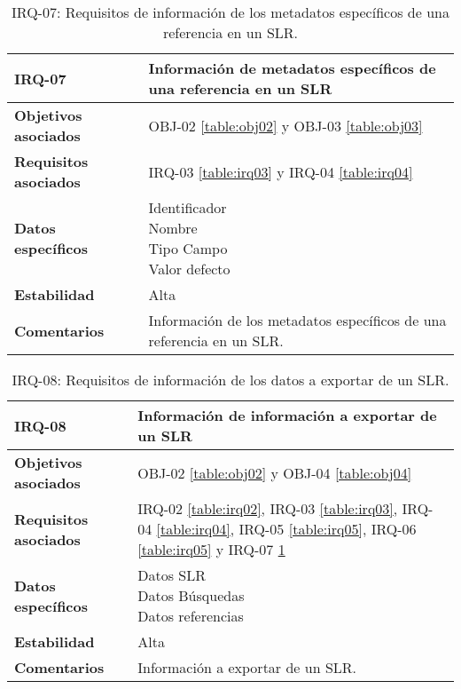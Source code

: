 \begin{table}[!hbt]
	\begin{center}
		\begin{tabular}{|p{5cm}|p{10cm}|}
			\hline
			\textbf{IRQ-07} & Información de metadatos específicos de una referencia en un SLR\\
			\hline
			\textbf{Objetivos asociados} & OBJ-02 \ref{table:obj02} y OBJ-03 \ref{table:obj03}\\
			\hline
			\textbf{Requisitos asociados} & IRQ-03 \ref{table:irq03} y IRQ-04 \ref{table:irq04}\\
			\hline
			\textbf{Datos específicos} & \shortstack[l]{Identificador \\ Nombre \\ Tipo Campo \\ Valor defecto} \\
			\hline
			\textbf{Estabilidad} & Alta\\
			\hline
			\textbf{Comentarios} & Información de los metadatos específicos de una referencia en un SLR.\\
			\hline
		\end{tabular}
		\caption{IRQ-07: Requisitos de información de los metadatos específicos de una referencia en un SLR.}
		\label{table:irq07}
	\end{center}
\end{table}

\begin{table}[!hbt]
	\begin{center}
		\begin{tabular}{|p{5cm}|p{10cm}|}
			\hline
			\textbf{IRQ-08} & Información de información a exportar de un SLR\\
			\hline
			\textbf{Objetivos asociados} & OBJ-02 \ref{table:obj02} y OBJ-04 \ref{table:obj04}\\
			\hline
			\textbf{Requisitos asociados} & IRQ-02 \ref{table:irq02}, IRQ-03 \ref{table:irq03}, IRQ-04 \ref{table:irq04}, IRQ-05 \ref{table:irq05}, IRQ-06 \ref{table:irq05} y IRQ-07 \ref{table:irq07} \\
			\hline
			\textbf{Datos específicos} & \shortstack[l]{Datos SLR \\ Datos Búsquedas \\ Datos referencias} \\
			\hline
			\textbf{Estabilidad} & Alta\\
			\hline
			\textbf{Comentarios} & Información a exportar de un SLR.\\
			\hline
		\end{tabular}
		\caption{IRQ-08: Requisitos de información de los datos a exportar de un SLR.}
		\label{table:irq08}
	\end{center}
\end{table}

